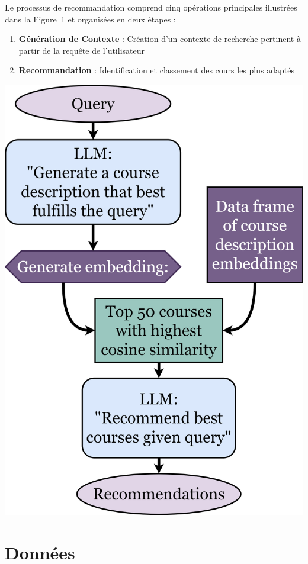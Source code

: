 Le processus de recommandation comprend cinq opérations principales illustrées dans la Figure~1 et organisées en deux étapes :

\begin{enumerate}
    \item \textbf{Génération de Contexte} : Création d’un contexte de recherche pertinent à partir de la requête de l’utilisateur
    \item \textbf{Recommandation} : Identification et classement des cours les plus adaptés
\end{enumerate}
\begin{minipage}{1\textwidth}
		\centering
		\includegraphics[width=\linewidth]{images/EmbRecommenderDiagram.png}
\end{minipage}
\section{Données}

